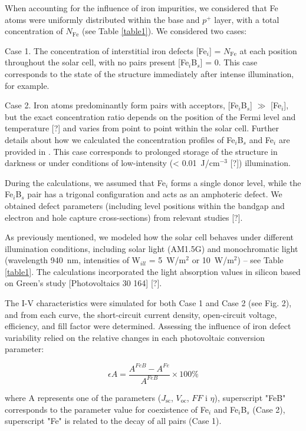 \documentclass[a4paper,fleqn]{cas-sc}
\begin{document}
When accounting for the influence of iron impurities, we considered that Fe atoms were uniformly distributed within the base and $p^+$ layer, with a total concentration of $N$$\mathrm{_{Fe}}$ (see Table \ref{table1}). We considered two cases:


Case 1. The concentration of interstitial iron defects [Fe$_i$] = $N$$\mathrm{_{Fe}}$  at each position throughout the solar cell, with no pairs present [Fe$_i$B$_s$] = 0. This case corresponds to the state of the structure immediately after intense illumination, for example.


Case 2.  Iron atoms predominantly form pairs with acceptors, [Fe$_i$B$_s$] $\gg$ [Fe$_i$], but the exact concentration ratio depends on the position of the Fermi level and temperature [?] and varies from point to point within the solar cell. Further details about how we calculated the concentration profiles of Fe$_i$B$_s$ and Fe$_i$ are provided in \cite{PratapSingh2019}. This case corresponds to prolonged storage of the structure in darkness or under conditions of low-intensity (< 0.01~J/$\mathrm{cm}^{-3}$ [?]) illumination.


During the calculations, we assumed that Fe$_i$ forms a single donor level, while the Fe$_i$B$_s$ pair has a trigonal configuration and acts as an amphoteric defect. We obtained defect parameters (including level positions within the bandgap and electron and hole capture cross-sections) from relevant studies [?].


As previously mentioned, we modeled how the solar cell behaves under different illumination conditions, including solar light (AM1.5G) and monochromatic light (wavelength 940~nm, intensities of W$_{ill}$ = 5~W/$\mathrm{m}^{2}$ or 10~W/$\mathrm{m}^{2}$) – see Table \ref{table1}. The calculations incorporated the light absorption values in silicon based on Green's study [Photovoltaics 30 164] [?].


The I-V characteristics were simulated for both Case 1 and Case 2 (see Fig. 2), and from each curve, the short-circuit current density, open-circuit voltage, efficiency, and fill factor were determined. Assessing the influence of iron defect variability relied on the relative changes in each photovoltaic conversion parameter:

\begin{equation}
    \epsilon A = \frac{A^{FeB} - A^{Fe}}{A^{FeB}} \times 100 \%
\end{equation}

where A represents one of the parameters ($J$$\mathrm{_{sc}}$, $V$$\mathrm{_{oc}}$, $FF$ i $\eta$), superscript "FeB" corresponds to the parameter value for coexistence of Fe$_i$ and Fe$_i$B$_s$ (Case 2), superscript "Fe" is related to the decay of all pairs (Case 1).
\end{document}
